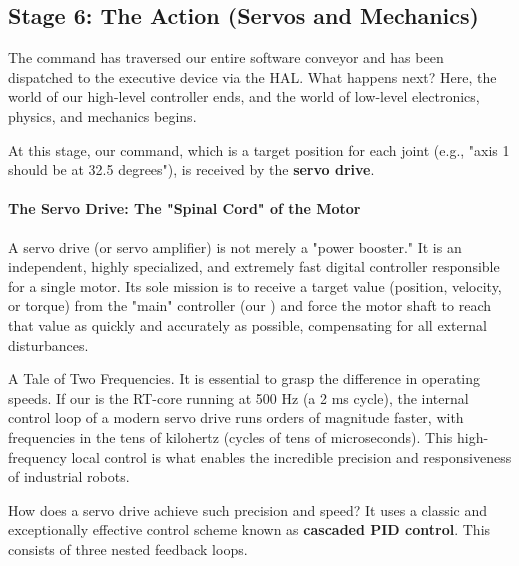 \subsection{Stage 6: The Action (Servos and Mechanics)}
\label{subsec:stage6_action}

The command has traversed our entire software conveyor and has been dispatched to the executive device via the HAL. What happens next? Here, the world of our high-level controller ends, and the world of low-level electronics, physics, and mechanics begins.

At this stage, our command, which is a target position for each joint (e.g., "axis 1 should be at 32.5 degrees"), is received by the \textbf{servo drive}.

\paragraph{The Servo Drive: The "Spinal Cord" of the Motor}
A servo drive (or servo amplifier) is not merely a "power booster." It is an independent, highly specialized, and extremely fast digital controller responsible for a single motor. Its sole mission is to receive a target value (position, velocity, or torque) from the "main" controller (our ) and force the motor shaft to reach that value as quickly and accurately as possible, compensating for all external disturbances.

\begin{principlebox}{A Tale of Two Frequencies.}
    It is essential to grasp the difference in operating speeds. If our  is the RT-core running at 500 Hz (a 2 ms cycle), the internal control loop of a modern servo drive runs orders of magnitude faster, with frequencies in the tens of kilohertz (cycles of tens of microseconds). This high-frequency local control is what enables the incredible precision and responsiveness of industrial robots.
\end{principlebox}

How does a servo drive achieve such precision and speed? It uses a classic and exceptionally effective control scheme known as \textbf{cascaded PID control}. This consists of three nested feedback loops.


